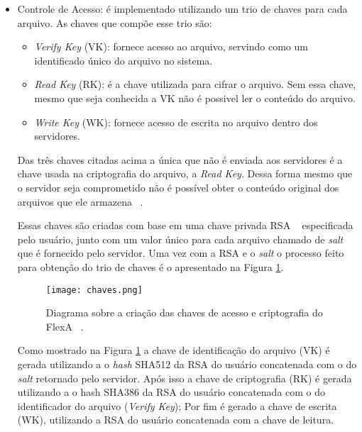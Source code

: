     	 \begin{itemize}
    	 
    	    \item Controle de Acesso: é implementado utilizando um trio de chaves para cada arquivo. As chaves que compõe esse trio são:
        	    \begin{itemize}
        	        \item \textit{Verify Key} (VK): fornece acesso ao arquivo, servindo como um identificado único do arquivo no sistema.
        	        \item \textit{Read Key} (RK): é a chave utilizada para cifrar o arquivo. Sem essa chave, mesmo que seja conhecida a VK não é possivel ler o conteúdo do arquivo.
        	        
        	        \item \textit{Write Key} (WK): fornece acesso de escrita no arquivo dentro dos servidores.
        	    \end{itemize}
        	    
            Das três chaves citadas acima a única que não é enviada aos servidores é a chave usada na criptografia do arquivo, a \textit{Read Key}. Dessa forma mesmo que o servidor seja comprometido não é possível obter o conteúdo original dos arquivos que ele armazena ~\cite{mario}.
        	    
        	    
        	    Essas chaves são criadas com base em uma chave privada RSA ~\cite{shamirRSA} especificada pelo usuário, junto com um valor único para cada arquivo chamado de \textit{salt} que é fornecido pelo servidor. Uma vez com a RSA e o \textit{\textit{salt}} o processo feito para obtenção do trio de chaves é o apresentado na Figura \ref{fig:chavesFlexa}.
        	    
        	    \begin{figure}
        	    \centering
        	    \texttt{[image: chaves.png]}
        	    \caption{Diagrama sobre a criação das chaves de acesso e criptografia do FlexA ~\cite{mario}.}
        	    \label{fig:chavesFlexa}
        	    \end{figure}
        	    
        	    Como mostrado na Figura \ref{fig:chavesFlexa} a chave de identificação do arquivo (VK) é gerada utilizando a o \textit{hash} SHA512 da RSA do usuário concatenada com o do \textit{salt} retornado pelo servidor.
        	    Após isso a chave de criptografia (RK) é gerada utilizando a o hash SHA386 da RSA do usuário concatenada com o do identificador do arquivo (\textit{Verify Key});
        	    Por fim é gerado a chave de escrita (WK), utilizando a RSA do usuário concatenada com a chave de leitura.
        	    

\end{itemize}
